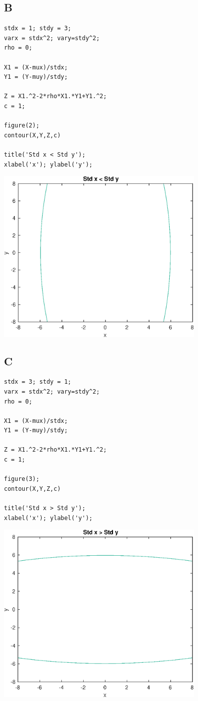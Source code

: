 \documentclass[12pt]{article}
\begin{document}
\subsection*{B}

\begin{verbatim}
stdx = 1; stdy = 3;
varx = stdx^2; vary=stdy^2;
rho = 0;

X1 = (X-mux)/stdx;
Y1 = (Y-muy)/stdy;

Z = X1.^2-2*rho*X1.*Y1+Y1.^2;
c = 1;

figure(2);
contour(X,Y,Z,c)

title('Std x < Std y');
xlabel('x'); ylabel('y');
\end{verbatim}

\includegraphics [width=4in]{prob_5_75_02.eps}


\subsection*{C}

\begin{verbatim}
stdx = 3; stdy = 1;
varx = stdx^2; vary=stdy^2;
rho = 0;

X1 = (X-mux)/stdx;
Y1 = (Y-muy)/stdy;

Z = X1.^2-2*rho*X1.*Y1+Y1.^2;
c = 1;

figure(3);
contour(X,Y,Z,c)

title('Std x > Std y');
xlabel('x'); ylabel('y');
\end{verbatim}

\includegraphics [width=4in]{prob_5_75_03.eps}
\end{document}
